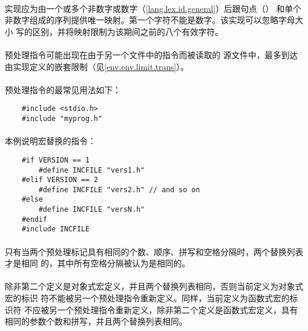 {\paragraph{}
实现应为由一个或多个非数字或数字（\ref{lang.lex.id.general}）后跟句点（）
和单个非数字组成的序列提供唯一映射。第一个字符不能是数字。该实现可以忽略字母大小
写的区别，并将映射限制为该期间之前的八个有效字符。

\paragraph{}
预处理指令可能出现在由于另一个文件中的指令而被读取的
源文件中，最多到达由实现定义的嵌套限制（见\ref{env.env.limit.trans}）。

\paragraph{}
\ex {}预处理指令的最常见用法如下：
\begin{lstlisting}
    #include <stdio.h>
    #include "myprog.h"
\end{lstlisting}

\paragraph{}
\ex 本例说明宏替换的指令：
\begin{lstlisting}
    #if VERSION == 1
        #define INCFILE "vers1.h"
    #elif VERSION == 2
        #define INCFILE "vers2.h" // and so on
    #else
        #define INCFILE "versN.h"
    #endif
    #include INCFILE
\end{lstlisting}


\constraint
\paragraph{}
只有当两个预处理标记具有相同的个数、顺序、拼写和空格分隔时，两个替换列表才是相同
的，其中所有空格分隔被认为是相同的。

\paragraph{}
除非第二个定义是对象式宏定义，并且两个替换列表相同，否则当前定义为对象式宏的标识
符不能被另一个预处理指令重新定义。同样，当前定义为函数式宏的标识符
不应被另一个预处理指令重新定义，除非第二个定义是函数式宏定义，具有
相同的参数个数和拼写，并且两个替换列表相同。

}
